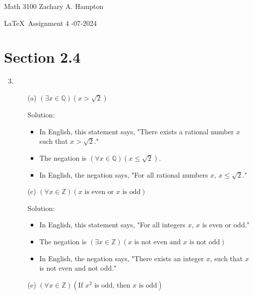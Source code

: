 \documentclass[12pt]{article}
\theoremstyle{definition}
\newcommand{\solution}{\textcolor{PineGreen}{Solution:\newline}}
\begin{document}
Math 3100 \hfill Zachary A. Hampton

\LaTeX~Assignment 4 \hfill 
{}-07-2024

\bigskip

\section*{Section 2.4}

\begin{enumerate}[leftmargin=*]
\setcounter{enumi}{2}
\item %

    \begin{enumerate}
        \item [(a)] \((\exists x \in \mathbb{Q})(x > \sqrt{2})\)
        
        \solution 
        \begin{itemize}
            \item In English, this statement says, "There exists a rational number \(x\) such that \(x > \sqrt{2}\)."
            \item The negation is \((\forall x \in \mathbb{Q})(x \leq \sqrt{2})\).
            \item In English, the negation says, "For all rational numbers \(x\), \(x \leq \sqrt{2}\)."
        \end{itemize}

        \item [(c)] \((\forall x \in \mathbb{Z})(x \text{ is even or } x \text{ is odd})\)
        
        \solution
        \begin{itemize}
            \item In English, this statement says, "For all integers \(x\), \(x\) is even or odd."
            \item The negation is \((\exists x \in \mathbb{Z})(x \text{ is not even and } x \text{ is not odd})\)
            \item In English, the negation says, "There exists an integer \(x\), such that \(x\) is not even and not odd."
        \end{itemize}

        \item [(e)] \((\forall x \in \mathbb{Z})(\text{If } x^2 \text{ is odd, then } x \text{ is odd})\)
        

\end{enumerate}
\end{enumerate}
\end{document}
